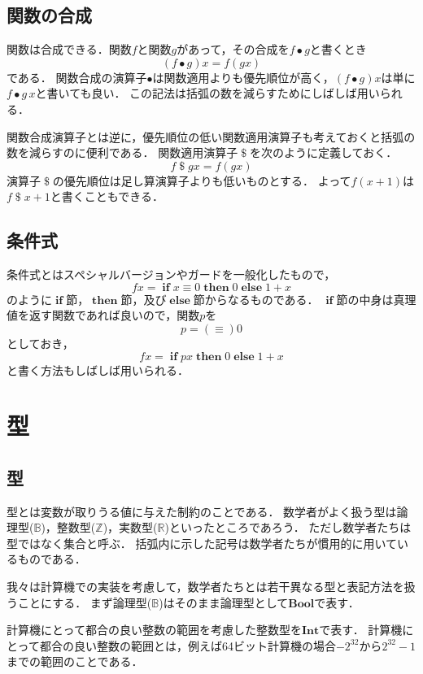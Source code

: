 \documentclass[twocolumn]{jsbook}
\newcommand{\typename}[1]{\mathbf{#1}}
\newcommand{\typebool}{\typename{Bool}}
\newcommand{\typeint}{\typename{Int}}
\newcommand{\binaryeq}{\equiv}
\newcommand{\binarycompose}{\bullet}
\newcommand{\binaryapply}{\mathop{\$}}
\newcommand{\keywordname}[1]{\mathbf{#1}}
\newcommand{\keywordif}{\mathop{\keywordname{if}}}
\newcommand{\keywordthen}{\mathop{\keywordname{then}}}
\newcommand{\keywordelse}{\mathop{\keywordname{else}}}
\newcommand{\mathsetname}[1]{\mathbb{#1}}
\begin{document}
\section{関数の合成}

関数は合成できる．関数$f$と関数$g$があって，その合成を$f\binarycompose g$と書くとき$$(f\binarycompose g)x=f(gx)$$である．
関数合成の演算子$\binarycompose$は関数適用よりも優先順位が高く，$(f\binarycompose g)x$は単に$f\binarycompose g\,x$と書いても良い．
この記法は括弧の数を減らすためにしばしば用いられる．

関数合成演算子とは逆に，優先順位の低い関数適用演算子も考えておくと括弧の数を減らすのに便利である．
関数適用演算子$\binaryapply$を次のように定義しておく．
$$f\binaryapply gx=f(gx)$$
演算子$\binaryapply$の優先順位は足し算演算子よりも低いものとする．
よって$f(x+1)$は$f\binaryapply x+1$と書くこともできる．

\section{条件式}

条件式とはスペシャルバージョンやガードを一般化したもので，
$$fx=\keywordif x\binaryeq0\keywordthen0\keywordelse 1+x$$
のように$\keywordif$節，$\keywordthen$節，及び$\keywordelse$節からなるものである．
$\keywordif$節の中身は真理値を返す関数であれば良いので，関数$p$を$$p=(\equiv)0$$としておき，$$fx=\keywordif px\keywordthen0\keywordelse 1+x$$と書く方法もしばしば用いられる．

\chapter{型}

\section{型}

型とは変数が取りうる値に与えた制約のことである．
数学者がよく扱う型は論理型($\mathsetname{B}$)，整数型($\mathsetname{Z}$)，実数型($\mathsetname{R}$)といったところであろう．
ただし数学者たちは型ではなく集合と呼ぶ．
括弧内に示した記号は数学者たちが慣用的に用いているものである．

我々は計算機での実装を考慮して，数学者たちとは若干異なる型と表記方法を扱うことにする．
まず論理型($\mathsetname{B}$)はそのまま論理型として$\typebool$で表す．

計算機にとって都合の良い整数の範囲を考慮した整数型を$\typeint$で表す．
計算機にとって都合の良い整数の範囲とは，例えば64ビット計算機の場合$-2^{32}$から$2^{32}-1$までの範囲のことである．
\end{document}
